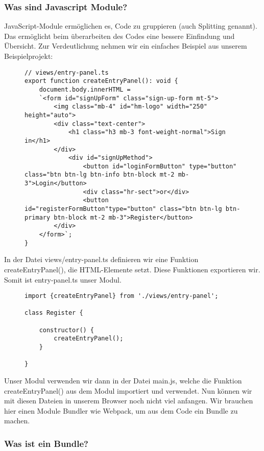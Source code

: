 \subsubsection{Was sind Javascript Module?}
JavaScript-Module ermöglichen es, Code zu gruppieren (auch \glqq{}Splitting\grqq{} genannt). Das ermöglicht beim überarbeiten des Codes eine bessere Einfindung und Übersicht. Zur Verdeutlichung nehmen wir ein einfaches Beispiel aus unserem Beispielprojekt:


\begin{figure}[H]
\begin{lstlisting}
// views/entry-panel.ts
export function createEntryPanel(): void {
    document.body.innerHTML = 
    `<form id="signUpForm" class="sign-up-form mt-5">
        <img class="mb-4" id="hm-logo" width="250" height="auto">
        <div class="text-center">
            <h1 class="h3 mb-3 font-weight-normal">Sign in</h1>
        </div>
            <div id="signUpMethod">
                <button id="loginFormButton" type="button" class="btn btn-lg btn-info btn-block mt-2 mb-3">Login</button>
                <div class="hr-sect">or</div>
                <button id="registerFormButton"type="button" class="btn btn-lg btn-primary btn-block mt-2 mb-3">Register</button>
        </div>
    </form>`;
}
\end{lstlisting}
\end{figure}
In der Datei views/entry-panel.ts definieren wir eine Funktion createEntryPanel(), die HTML-Elemente setzt. Diese Funktionen exportieren wir. Somit ist entry-panel.ts unser Modul.

\begin{figure}[H]
\begin{lstlisting}
import {createEntryPanel} from './views/entry-panel';

class Register {

    constructor() {
        createEntryPanel();
    }
    
}
\end{lstlisting}
\end{figure}

Unser Modul verwenden wir dann in der Datei main.js, welche die Funktion createEntryPanel() aus dem Modul importiert und verwendet. Nun können wir mit diesen Dateien in unserem Browser noch nicht viel anfangen. Wir brauchen hier einen Module Bundler wie Webpack, um aus dem Code ein Bundle zu machen.

\subsubsection{Was ist ein Bundle?}

